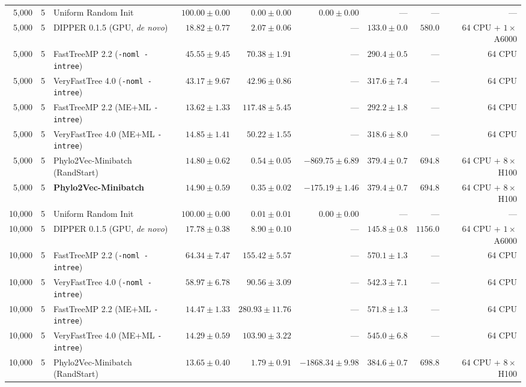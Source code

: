 \begin{table}[!htbp]
{\begin{tabular}{@{}rrlrrrrrr@{}}
\midrule
5,000 & 5 & Uniform Random Init & $100.00 \pm 0.00$ & $0.00 \pm 0.00$ & $0.00 \pm 0.00$ & --- & --- & ---\\
5,000 & 5 & DIPPER 0.1.5 (GPU, \textit{de novo}) & $18.82 \pm 0.77$ & $2.07 \pm 0.06$ & --- & $133.0 \pm 0.0$ & $580.0$ & 64 CPU + $1\times$ A6000\\
5,000 & 5 & FastTreeMP 2.2 (\texttt{-noml -intree}) & $45.55 \pm 9.45$ & $70.38 \pm 1.91$ & --- & $290.4 \pm 0.5$ & --- & 64 CPU\\
5,000 & 5 & VeryFastTree 4.0 (\texttt{-noml -intree}) & $43.17 \pm 9.67$ & $42.96 \pm 0.86$ & --- & $317.6 \pm 7.4$ & --- & 64 CPU\\
5,000 & 5 & FastTreeMP 2.2 (ME+ML \texttt{-intree}) & $\mathbf{13.62 \pm 1.33}$ & $117.48 \pm 5.45$ & --- & $292.2 \pm 1.8$ & --- & 64 CPU\\
5,000 & 5 & VeryFastTree 4.0 (ME+ML \texttt{-intree}) & $14.85 \pm 1.41$ & $50.22 \pm 1.55$ & --- & $318.6 \pm 8.0$ & --- & 64 CPU\\
5,000 & 5 & Phylo2Vec-Minibatch (RandStart) & $14.80 \pm 0.62$ & $0.54 \pm 0.05$ & $-869.75 \pm 6.89$ & $379.4 \pm 0.7$ & $694.8$ & 64 CPU + $8\times$ H100\\
5,000 & 5 & \textbf{Phylo2Vec-Minibatch} & $14.90 \pm 0.59$ & $\mathbf{0.35 \pm 0.02}$ & $-175.19 \pm 1.46$ & $379.4 \pm 0.7$ & $694.8$ & 64 CPU + $8\times$ H100\\
\midrule
10,000 & 5 & Uniform Random Init & $100.00 \pm 0.00$ & $0.01 \pm 0.01$ & $0.00 \pm 0.00$ & --- & --- & ---\\
10,000 & 5 & DIPPER 0.1.5 (GPU, \textit{de novo}) & $17.78 \pm 0.38$ & $8.90 \pm 0.10$ & --- & $145.8 \pm 0.8$ & $1156.0$ & 64 CPU + $1\times$ A6000\\
10,000 & 5 & FastTreeMP 2.2 (\texttt{-noml -intree}) & $64.34 \pm 7.47$ & $155.42 \pm 5.57$ & --- & $570.1 \pm 1.3$ & --- & 64 CPU\\
10,000 & 5 & VeryFastTree 4.0 (\texttt{-noml -intree}) & $58.97 \pm 6.78$ & $90.56 \pm 3.09$ & --- & $542.3 \pm 7.1$ & --- & 64 CPU\\
10,000 & 5 & FastTreeMP 2.2 (ME+ML \texttt{-intree}) & $14.47 \pm 1.33$ & $280.93 \pm 11.76$ & --- & $571.8 \pm 1.3$ & --- & 64 CPU\\
10,000 & 5 & VeryFastTree 4.0 (ME+ML \texttt{-intree}) & $14.29 \pm 0.59$ & $103.90 \pm 3.22$ & --- & $545.0 \pm 6.8$ & --- & 64 CPU\\
10,000 & 5 & Phylo2Vec-Minibatch (RandStart) & $\mathbf{13.65 \pm 0.40}$ & $1.79 \pm 0.91$ & $-1868.34 \pm 9.98$ & $384.6 \pm 0.7$ & $698.8$ & 64 CPU + $8\times$ H100\\

\end{tabular}}
\end{table}
